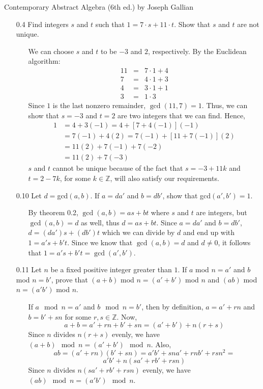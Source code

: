 \documentclass[12pt]{article}
\begin{document}
Contemporary Abstract Algebra (6th ed.) by Joseph Gallian
\begin{enumerate}

\item[0.4] Find integers $s$ and $t$ such that $1 = 7 \cdot s + 11 \cdot t$. Show that $s$ and
$t$ are not unique.
\begin{enumerate}
\item[] We can choose $s$ and $t$ to be $-3$ and $2$, respectively. By the Euclidean algorithm:
\begin{eqnarray*}
11 &=& 7 \cdot 1 + 4 \\
7 &=& 4 \cdot 1 + 3 \\
4 &=& 3 \cdot 1 + 1 \\
3 &=& 1 \cdot 3
\end{eqnarray*}
Since $1$ is the last nonzero remainder, $\gcd(11, 7) = 1$. Thus, we can show that $s = -3$ and
$t = 2$ are two integers that we can find. Hence,
\begin{align*}
1 &= 4 + 3(-1) = 4 + [7 + 4(-1)](-1) \\
&= 7(-1) + 4(2) = 7(-1) + [11 + 7(-1)](2) \\
&= 11(2) + 7(-1) + 7(-2) \\
&= 11(2) + 7(-3)
\end{align*}
$s$ and $t$ cannot be unique because of the fact that $s = -3 + 11k$ and 
$t = 2 - 7k$, for some $k \in \mathbb{Z}$, will also satisfy our requirements. 
\end{enumerate}

\item[0.10] Let $d = $gcd$(a, b)$. If $a = da'$ and $b = db'$, show that gcd$(a', b') = 1$.
\begin{enumerate}
\item[] By theorem 0.2, $\gcd(a, b) = as + bt$ where $s$ and $t$ are integers, 
but $\gcd(a, b) = d$ as well, thus
$d = as + bt$. Since $a = da'$ and $b = db'$, $d = (da')s + (db')t$ which we can divide
by $d$ and end up with $1 = a's + b't$. Since we know that $\gcd(a, b) = d$ and $d \neq 0$,
it follows that $1 = a's + b't = \gcd(a', b')$.
\end{enumerate}

\item[0.11] Let $n$ be a fixed positive integer greater than $1$. If $a$ mod $n = a'$ and 
$b$ mod $n = b'$, prove that $(a + b)$ mod $n = (a' + b')$ mod $n$ and $(ab)$ mod $n = 
(a'b')$ mod $n$.
\begin{enumerate}
\item[] If $a\mod n = a'$ and $b \mod n = b'$, then by definition, $a = a' + rn$ and 
$b = b' + sn$ for some $r, s \in \mathbb{Z}$. Now,
\[ 
a + b = a' + rn + b' + sn = (a' + b') + n(r + s)
\]
Since $n$ divides $n(r + s)$ evenly, we have $(a + b)\mod n = (a' + b')\mod n $.
Also, 
\[
ab = (a' + rn)(b' + sn) = a'b' + sna' + rnb' + rsn^2 = \]
\[
a'b' + n(sa' + rb' + rsn)
\]
Since $n$ divides $n(sa' + rb' + rsn)$ evenly, we have $(ab)\mod n = (a'b')\mod n$.
\end{enumerate}



\end{enumerate}
\end{document}
